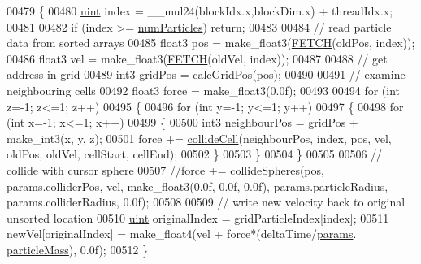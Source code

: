 \begin{DoxyCode}
00479 \{
00480     \hyperlink{particles__kernel_8cuh_a91ad9478d81a7aaf2593e8d9c3d06a14}{uint} index = \_\_mul24(blockIdx.x,blockDim.x) + threadIdx.x;
00481 
00482     \textcolor{keywordflow}{if} (index >= \hyperlink{particles_8cpp_a05b8a90212054a3eb1a036ae0c269596}{numParticles}) \textcolor{keywordflow}{return};
00483 
00484     \textcolor{comment}{// read particle data from sorted arrays}
00485     float3 pos = make\_float3(\hyperlink{particles__kernel_8cuh_a12269d678a65f18889c2a7e98c756457}{FETCH}(oldPos, index));
00486     float3 vel = make\_float3(\hyperlink{particles__kernel_8cuh_a12269d678a65f18889c2a7e98c756457}{FETCH}(oldVel, index));
00487 
00488     \textcolor{comment}{// get address in grid}
00489     int3 gridPos = \hyperlink{particles__kernel__impl_8cuh_a63d62750e6cbb8781c5ff252fc13c1fd}{calcGridPos}(pos);
00490 
00491     \textcolor{comment}{// examine neighbouring cells}
00492     float3 force = make\_float3(0.0f);
00493 
00494     \textcolor{keywordflow}{for} (\textcolor{keywordtype}{int} z=-1; z<=1; z++)
00495     \{
00496         \textcolor{keywordflow}{for} (\textcolor{keywordtype}{int} y=-1; y<=1; y++)
00497         \{
00498             \textcolor{keywordflow}{for} (\textcolor{keywordtype}{int} x=-1; x<=1; x++)
00499             \{
00500                 int3 neighbourPos = gridPos + make\_int3(x, y, z);
00501                 force += \hyperlink{particles__kernel__impl_8cuh_a8e623e11d4ac873cfbe9d7c916326363}{collideCell}(neighbourPos, index, pos, vel, oldPos, oldVel, cellStart, 
      cellEnd);
00502             \}
00503         \}
00504     \}
00505 
00506     \textcolor{comment}{// collide with cursor sphere}
00507     \textcolor{comment}{//force += collideSpheres(pos, params.colliderPos, vel, make\_float3(0.0f, 0.0f, 0.0f),
       params.particleRadius, params.colliderRadius, 0.0f);}
00508 
00509     \textcolor{comment}{// write new velocity back to original unsorted location}
00510     \hyperlink{particles__kernel_8cuh_a91ad9478d81a7aaf2593e8d9c3d06a14}{uint} originalIndex = gridParticleIndex[index];
00511     newVel[originalIndex] = make\_float4(vel + force*(deltaTime/\hyperlink{particles__kernel__impl_8cuh_a8db8938e28edd17862daf58651051bdc}{params}.
      \hyperlink{struct_sim_params_afab015432bd796517e5f540f6f7228e4}{particleMass}), 0.0f);
00512 \}
\end{DoxyCode}
